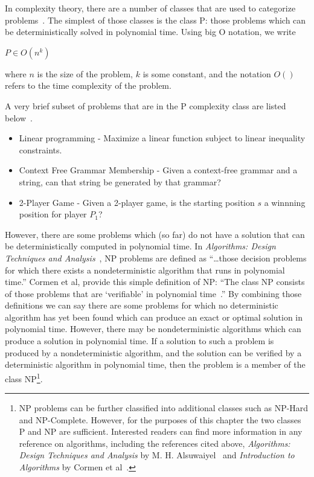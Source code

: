 In complexity theory, there are a number of classes that are used to categorize
problems~\cite{alsuwaiyel1999algorithms,Cormen:2009:IAT:1614191}. The simplest
of those classes is the class P: those problems which can be deterministically
solved in polynomial time. Using big O notation, we write

\(P \in O(n^{k})\)

where \(n\) is the size of the problem, \(k\) is some constant, and the
notation \(O()\) refers to the time complexity of the problem.

A very brief subset of problems that are in the P complexity class are listed
below~\cite{greenlaw1991compendium}.

\begin{itemize}
\item{Linear programming - Maximize a linear function subject to linear
inequality constraints.} 
\item{Context Free Grammar Membership - Given a context-free grammar and a
string, can that string be generated by that grammar?}
\item {2-Player Game - Given a 2-player game, is the starting position \(s\) a
winnning position for player \(P_1\)?}
\end{itemize}

However, there are some problems which (so far) do not have a solution that can
be deterministically computed in polynomial time. In \emph{Algorithms: Design
Techniques and Analysis}~\cite{alsuwaiyel1999algorithms}, NP problems are
defined as ``\ldots those decision problems for which there exists a
nondeterministic algorithm that runs in polynomial time.'' Cormen et al, provide
this simple definition of NP: ``The class NP consists of those problems that are
`verifiable' in polynomial time~\cite{Cormen:2009:IAT:1614191}.'' By combining
those definitions we can say there are some problems for which no deterministic
algorithm has yet been found which can produce an exact or optimal solution in
polynomial time. However, there may be nondeterministic algorithms which can
produce a solution in polynomial time. If a solution to such a problem is
produced by a nondeterministic algorithm, and the solution can be verified by a
deterministic algorithm in polynomial time, then the problem is a member of the
class NP\footnote{NP problems can be further classified into additional
classes such as NP-Hard and NP-Complete. However, for the purposes of this
chapter the two classes P and NP are sufficient. Interested readers can find
more information in any reference on algorithms, including the references cited
above, \emph{Algorithms: Design Techniques and Analysis} by M. H.
Alsuwaiyel~\cite{alsuwaiyel1999algorithms} and \emph{Introduction to Algorithms}
by Cormen et al~\cite{Cormen:2009:IAT:1614191}.}.

